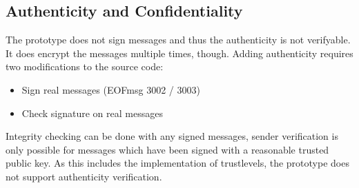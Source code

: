 \subsection{Authenticity and Confidentiality}
The prototype does not sign messages and thus the authenticity is not
verifyable. It does encrypt the messages multiple times, though.
Adding authenticity requires two modifications to the source code:
\begin{itemize}
\item Sign real messages (EOFmsg 3002 / 3003)
\item Check signature on real messages
\end{itemize}
Integrity checking can be done with any signed messages, sender verification
is only possible for messages which have been signed with a reasonable
trusted public key. As this includes the implementation of trustlevels, the
prototype does not support authenticity verification.
